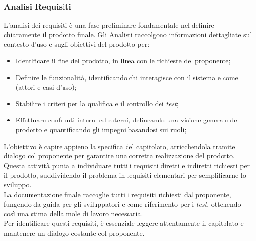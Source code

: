 \documentclass[5pt]{article}
\begin{document}
\subsubsection{Analisi Requisiti}
L'analisi dei requisiti è una fase preliminare fondamentale nel definire chiaramente il prodotto finale. Gli Analisti raccolgono informazioni dettagliate sul contesto d'uso e sugli obiettivi del prodotto per:
\begin{itemize}
    \item Identificare il fine del prodotto, in linea con le richieste del proponente;
    \item Definire le funzionalità, identificando chi interagisce con il sistema e come (attori e casi d'uso);
    \item Stabilire i criteri per la qualifica e il controllo dei \textit{test};
    \item Effettuare confronti interni ed esterni, delineando una visione generale del prodotto e quantificando gli impegni basandosi sui ruoli;
\end{itemize}
L'obiettivo è capire appieno la specifica del capitolato, arricchendola tramite dialogo col proponente per garantire una corretta realizzazione del prodotto.\\
Questa attività punta a individuare tutti i requisiti diretti e indiretti richiesti per il prodotto, suddividendo il problema in requisiti elementari per semplificarne lo sviluppo.\\
La documentazione finale raccoglie tutti i requisiti richiesti dal proponente, fungendo da guida per gli sviluppatori e come riferimento per i \textit{test}, ottenendo così una stima della mole di lavoro necessaria.\\
Per identificare questi requisiti, è essenziale leggere attentamente il capitolato e mantenere un dialogo costante col proponente.\\
\end{document}
